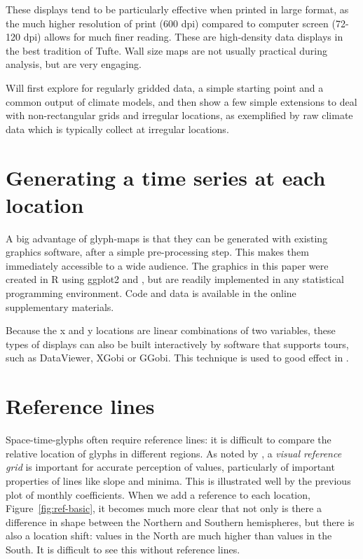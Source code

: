 \documentclass[oneside]{article}
\begin{document}
These displays tend to be particularly effective when printed in large format, as the much higher resolution of print (600 dpi) compared to computer  screen (72-120 dpi) allows for much finer reading. These are high-density data displays in the best tradition of Tufte. Wall size maps are not usually practical during analysis, but are very engaging.

Will first explore for regularly gridded data, a simple starting point and a common output of climate models, and then show a few simple extensions to deal with non-rectangular grids and irregular locations, as exemplified by raw climate data which is typically collect at irregular locations.

\section{Generating a time series at each location}

A big advantage of glyph-maps is that they can be generated with existing graphics software, after a simple pre-processing step. This makes them immediately accessible to a wide audience. The graphics in this paper were created in R \citep{R} using ggplot2 \citep{me:ggplot2,wickham:2007d} and \citep{me:plyr}, but are readily implemented in any statistical programming environment.  Code and data is available in the online supplementary materials.

Because the x and y locations are linear combinations of two variables, these types of displays can also be built interactively by software that supports tours, such as DataViewer, XGobi or GGobi.  This technique is used to good effect in \citet{buja:1996a}.

\section{Reference lines}

Space-time-glyphs often require reference lines: it is difficult to compare the relative location of glyphs in different regions. As noted by \citet{cleveland:1993a}, a \emph{visual reference grid} is important for accurate perception of values, particularly of important properties of lines like slope and minima. This is illustrated well by the previous plot of monthly coefficients. When we add a reference to each location, Figure~\ref{fig:ref-basic}, it becomes much more clear that not only is there a difference in shape between the Northern and Southern hemispheres, but there is also a location shift: values in the North are much higher than values in the South. It is difficult to see this without reference lines.
\end{document}
